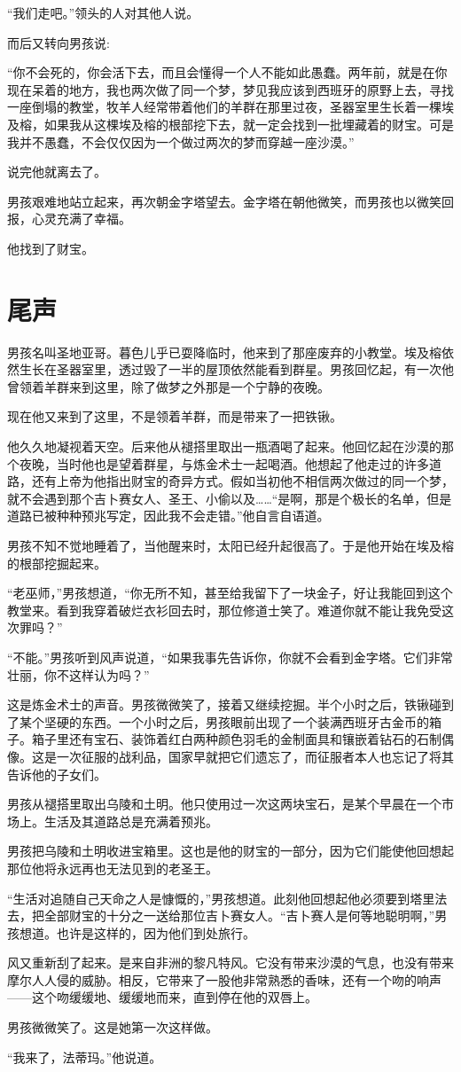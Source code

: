 \documentclass[twoside,openany]{book}
\begin{document}
“我们走吧。”领头的人对其他人说。

而后又转向男孩说:

“你不会死的，你会活下去，而且会懂得一个人不能如此愚蠢。两年前，就是在你现在呆着的地方，我也两次做了同一个梦，梦见我应该到西班牙的原野上去，寻找一座倒塌的教堂，牧羊人经常带着他们的羊群在那里过夜，圣器室里生长着一棵埃及榕，如果我从这棵埃及榕的根部挖下去，就一定会找到一批埋藏着的财宝。可是我并不愚蠢，不会仅仅因为一个做过两次的梦而穿越一座沙漠。”

说完他就离去了。

男孩艰难地站立起来，再次朝金字塔望去。金字塔在朝他微笑，而男孩也以微笑回报，心灵充满了幸福。

他找到了财宝。

\chapter{尾声}\label{ch1}

男孩名叫圣地亚哥。暮色儿乎已耍降临时，他来到了那座废弃的小教堂。埃及榕依然生长在圣器室里，透过毁了一半的屋顶依然能看到群星。男孩回忆起，有一次他曾领着羊群来到这里，除了做梦之外那是一个宁静的夜晚。

现在他又来到了这里，不是领着羊群，而是带来了一把铁锹。

他久久地凝视着天空。后来他从褪搭里取出一瓶酒喝了起来。他回忆起在沙漠的那个夜晚，当时他也是望着群星，与炼金术士一起喝酒。他想起了他走过的许多道路，还有上帝为他指出财宝的奇异方式。假如当初他不相信两次做过的同一个梦，就不会遇到那个吉卜赛女人、圣王、小偷以及……“是啊，那是个极长的名单，但是道路已被种种预兆写定，因此我不会走错。”他自言自语道。

男孩不知不觉地睡着了，当他醒来时，太阳已经升起很高了。于是他开始在埃及榕的根部挖掘起来。

“老巫师，”男孩想道，“你无所不知，甚至给我留下了一块金子，好让我能回到这个教堂来。看到我穿着破烂衣衫回去时，那位修道士笑了。难道你就不能让我免受这次罪吗？”

“不能。”男孩听到风声说道，“如果我事先告诉你，你就不会看到金字塔。它们非常壮丽，你不这样认为吗？”

这是炼金术士的声音。男孩微微笑了，接着又继续挖掘。半个小时之后，铁锹碰到了某个坚硬的东西。一个小时之后，男孩眼前出现了一个装满西班牙古金币的箱子。箱子里还有宝石、装饰着红白两种颜色羽毛的金制面具和镶嵌着钻石的石制偶像。这是一次征服的战利品，国家早就把它们遗忘了，而征服者本人也忘记了将其告诉他的子女们。

男孩从褪搭里取出乌陵和土明。他只使用过一次这两块宝石，是某个早晨在一个市场上。生活及其道路总是充满着预兆。

男孩把乌陵和土明收进宝箱里。这也是他的财宝的一部分，因为它们能使他回想起那位他将永远再也无法见到的老圣王。

“生活对追随自己天命之人是慷慨的，”男孩想道。此刻他回想起他必须要到塔里法去，把全部财宝的十分之一送给那位吉卜赛女人。“吉卜赛人是何等地聪明啊，”男孩想道。也许是这样的，因为他们到处旅行。

风又重新刮了起来。是来自非洲的黎凡特风。它没有带来沙漠的气息，也没有带来摩尔人人侵的威胁。相反，它带来了一股他非常熟悉的香味，还有一个吻的响声——这个吻缓缓地、缓缓地而来，直到停在他的双唇上。

男孩微微笑了。这是她第一次这样做。

“我来了，法蒂玛。”他说道。
\end{document}
